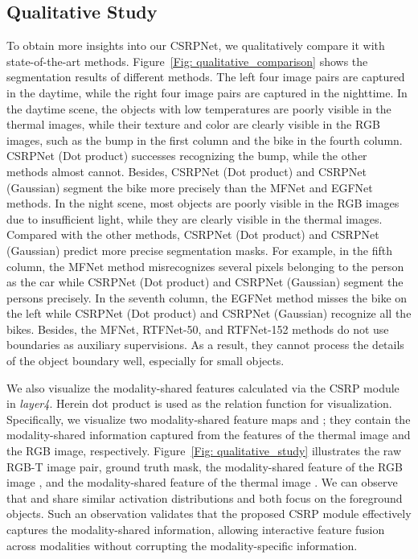 \subsection{Qualitative Study}
To obtain more insights into our CSRPNet, we qualitatively compare it with state-of-the-art methods. Figure~\ref{Fig: qualitative_comparison} shows the segmentation results of different methods. The left four image pairs are captured in the daytime, while the right four image pairs are captured in the nighttime. In the daytime scene, the objects with low temperatures are poorly visible in the thermal images, while their texture and color are clearly visible in the RGB images, such as the bump in the first column and the bike in the fourth column. CSRPNet (Dot product) successes recognizing the bump, while the other methods almost cannot. Besides, CSRPNet (Dot product) and CSRPNet (Gaussian) segment the bike more precisely than the MFNet and EGFNet methods. In the night scene, most objects are poorly visible in the RGB images due to insufficient light, while they are clearly visible in the thermal images. Compared with the other methods, CSRPNet (Dot product) and CSRPNet (Gaussian) predict more precise segmentation masks. For example, in the fifth column, the MFNet method misrecognizes several pixels belonging to the person as the car while CSRPNet (Dot product) and CSRPNet (Gaussian) segment the persons precisely. In the seventh column, the EGFNet method misses the bike on the left while CSRPNet (Dot product) and CSRPNet (Gaussian) recognize all the bikes. Besides, the MFNet, RTFNet-50, and RTFNet-152 methods do not use boundaries as auxiliary supervisions. As a result, they cannot process the details of the object boundary well, especially for small objects.


We also visualize the modality-shared features calculated via the CSRP module in \emph{layer4}. Herein dot product is used as the relation function for visualization. Specifically, we visualize two modality-shared feature maps  and ; they contain the modality-shared information captured from the features of the thermal image and the RGB image, respectively. Figure~\ref{Fig: qualitative_study} illustrates the raw RGB-T image pair, ground truth mask, the modality-shared feature of the RGB image , and the modality-shared feature of the thermal image . We can observe that  and  share similar activation distributions and both focus on the foreground objects. Such an observation validates that the proposed CSRP module effectively captures the modality-shared information, allowing interactive feature fusion across modalities without corrupting the modality-specific information.